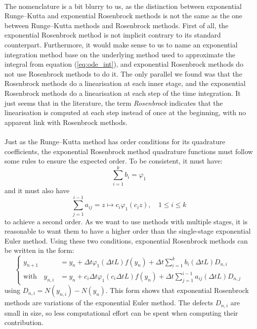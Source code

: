     \paragraph{}
    The nomenclature is a bit blurry to us, as the distinction between exponential Runge--Kutta and exponential Rosenbrock methods is not the same as the one between Runge--Kutta methods and Rosenbrock methods.
    First of all, the exponential Rosenbrock method is not implicit contrary to its standard counterpart.
    Furthermore, it would make sense to us to name an exponential integration method base on the underlying method used to approximate the integral from equation (\ref{eq:ode_int}), and exponential Rosenbrock methods do not use Rosenbrock methods to do it.
    The only parallel we found was that the Rosenbrock methods do a linearisation at each inner stage, and the exponential Rosenbrock methods do a linearisation at each step of the time integration.
    It just seems that in the literature, the term \emph{Rosenbrock} indicates that the linearisation is computed at each step instead of once at the beginning, with no apparent link with Rosenbrock methods.

    \paragraph{}
    Just as the Runge--Kutta method has order conditions for its quadrature coefficients, the exponential Rosenbrock method quadrature functions must follow some rules to ensure the expected order.
    To be consistent, it must have:
    \begin{equation}
      \sum_{i = 1}^k b_i = \varphi_1
    \end{equation}
    and it must also have
    \begin{equation}
       \sum_{j = 1}^{i-1} a_{ij} = z \mapsto c_i \varphi_1\left(c_i z\right), \quad 1 \leq i \leq k
    \end{equation}
    to achieve a second order.
    As we want to use methods with multiple stages, it is reasonable to want them to have a higher order than the single-stage exponential Euler method.
    Using these two conditions, exponential Rosenbrock methods can be written in the form:
    \begin{equation}\label{eq:exprb_defect}
      \left\{\begin{aligned}
        y_{n+1} &= y_n  + \Delta t \varphi_1\left(\Delta t L\right) f\left(y_n\right) + \Delta t \sum_{i = 1}^k b_i\left(\Delta t L\right) D_{n,i} \\
        \textrm{with}\quad y_{n,i} &= y_n  + c_i \Delta t \varphi_1\left(c_i \Delta t L\right) f\left(y_n\right) + \Delta t \sum_{j = 1}^{i-1} a_{ij}\left(\Delta t L\right) D_{n,j}
      \end{aligned}\right.
    \end{equation}
    using $D_{n,i} = N\left(y_{n,i}\right) - N\left(y_n\right)$.
    This form shows that exponential Rosenbrock methods are variations of the exponential Euler method.
    The defects $D_{n, i}$ are small in size, so less computational effort can be spent when computing their contribution.

